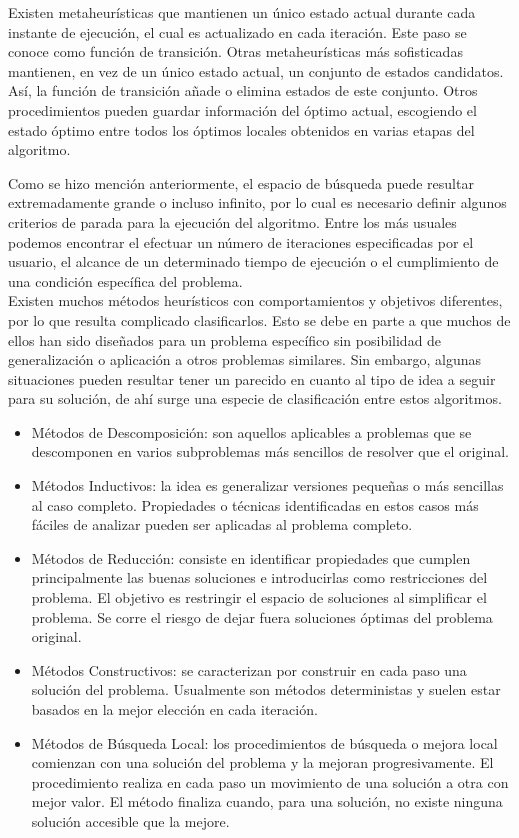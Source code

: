 \documentclass[a4paper,12pt]{book}
\begin{document}
	Existen metaheurísticas que mantienen un único estado actual durante cada instante de ejecución, el cual es actualizado en cada iteración. Este paso se conoce como función de transición. Otras metaheurísticas más sofisticadas mantienen, en vez de un único estado actual, un conjunto de estados candidatos. Así, la función de transición añade o elimina estados de este conjunto. Otros procedimientos pueden guardar información del óptimo actual, escogiendo el estado óptimo entre todos los óptimos locales obtenidos en varias etapas del algoritmo.
	
	Como se hizo mención anteriormente, el espacio de búsqueda puede resultar extremadamente grande o incluso infinito, por lo cual es necesario definir algunos criterios de parada para la ejecución del algoritmo. Entre los más usuales podemos encontrar el efectuar un número de iteraciones especificadas por el usuario, el alcance de un determinado tiempo de ejecución o el cumplimiento de una condición específica del problema. \\
	
	Existen muchos métodos heurísticos con comportamientos y objetivos diferentes, por lo que resulta complicado clasificarlos. Esto se debe en parte a que muchos de  ellos  han  sido  diseñados para un problema específico sin posibilidad de generalización o aplicación a otros problemas similares. Sin embargo, algunas situaciones pueden resultar tener un parecido en cuanto al tipo de idea a seguir para su solución, de ahí surge una especie de clasificación entre estos algoritmos.
	
	\begin{itemize}
		\item Métodos de Descomposición: son aquellos aplicables a problemas que se descomponen en varios subproblemas más sencillos de resolver que el original.
		
		\item Métodos Inductivos: la idea es generalizar versiones pequeñas o más sencillas al caso completo. Propiedades o técnicas identificadas en estos casos más fáciles de analizar pueden ser aplicadas al problema completo.
		
		\item Métodos de Reducción: consiste en identificar propiedades que cumplen principalmente las buenas soluciones e introducirlas como restricciones del problema.  El objetivo es restringir el espacio de soluciones al simplificar el problema. Se corre el riesgo de dejar fuera soluciones óptimas del problema original.
		
		\item Métodos Constructivos: se caracterizan por construir en cada paso una solución del problema. Usualmente son  métodos deterministas y suelen estar basados en la mejor elección en cada iteración.
		
		\item Métodos de Búsqueda Local: los  procedimientos  de  búsqueda o mejora local comienzan con una solución del problema y la mejoran progresivamente.  El procedimiento realiza en cada paso un movimiento de una solución a otra con mejor valor. El método finaliza cuando, para una solución, no existe ninguna solución accesible que la mejore.	\end{itemize}
	
\end{document}
